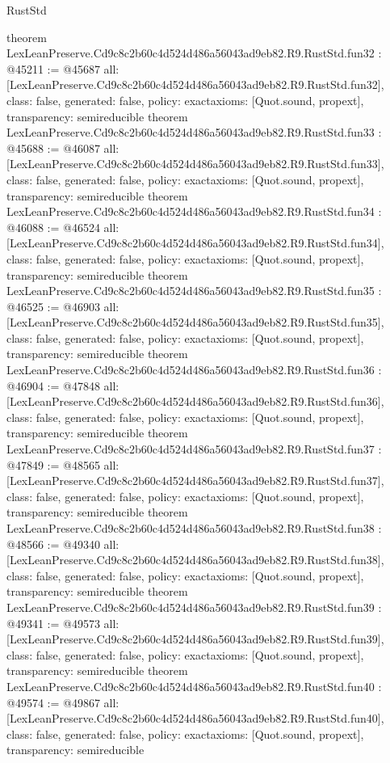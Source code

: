 \begin{lexlean}{RustStd}
\begin{coremodule}
{}
theorem LexLeanPreserve.Cd9c8c2b60c4d524d486a56043ad9eb82.R9.RustStd.fun32 : @45211 := @45687 {
  all: [LexLeanPreserve.Cd9c8c2b60c4d524d486a56043ad9eb82.R9.RustStd.fun32],
  class: false,
  generated: false,
  policy: exact{axioms: [Quot.sound, propext]},
  transparency: semireducible
}
theorem LexLeanPreserve.Cd9c8c2b60c4d524d486a56043ad9eb82.R9.RustStd.fun33 : @45688 := @46087 {
  all: [LexLeanPreserve.Cd9c8c2b60c4d524d486a56043ad9eb82.R9.RustStd.fun33],
  class: false,
  generated: false,
  policy: exact{axioms: [Quot.sound, propext]},
  transparency: semireducible
}
theorem LexLeanPreserve.Cd9c8c2b60c4d524d486a56043ad9eb82.R9.RustStd.fun34 : @46088 := @46524 {
  all: [LexLeanPreserve.Cd9c8c2b60c4d524d486a56043ad9eb82.R9.RustStd.fun34],
  class: false,
  generated: false,
  policy: exact{axioms: [Quot.sound, propext]},
  transparency: semireducible
}
theorem LexLeanPreserve.Cd9c8c2b60c4d524d486a56043ad9eb82.R9.RustStd.fun35 : @46525 := @46903 {
  all: [LexLeanPreserve.Cd9c8c2b60c4d524d486a56043ad9eb82.R9.RustStd.fun35],
  class: false,
  generated: false,
  policy: exact{axioms: [Quot.sound, propext]},
  transparency: semireducible
}
theorem LexLeanPreserve.Cd9c8c2b60c4d524d486a56043ad9eb82.R9.RustStd.fun36 : @46904 := @47848 {
  all: [LexLeanPreserve.Cd9c8c2b60c4d524d486a56043ad9eb82.R9.RustStd.fun36],
  class: false,
  generated: false,
  policy: exact{axioms: [Quot.sound, propext]},
  transparency: semireducible
}
theorem LexLeanPreserve.Cd9c8c2b60c4d524d486a56043ad9eb82.R9.RustStd.fun37 : @47849 := @48565 {
  all: [LexLeanPreserve.Cd9c8c2b60c4d524d486a56043ad9eb82.R9.RustStd.fun37],
  class: false,
  generated: false,
  policy: exact{axioms: [Quot.sound, propext]},
  transparency: semireducible
}
theorem LexLeanPreserve.Cd9c8c2b60c4d524d486a56043ad9eb82.R9.RustStd.fun38 : @48566 := @49340 {
  all: [LexLeanPreserve.Cd9c8c2b60c4d524d486a56043ad9eb82.R9.RustStd.fun38],
  class: false,
  generated: false,
  policy: exact{axioms: [Quot.sound, propext]},
  transparency: semireducible
}
theorem LexLeanPreserve.Cd9c8c2b60c4d524d486a56043ad9eb82.R9.RustStd.fun39 : @49341 := @49573 {
  all: [LexLeanPreserve.Cd9c8c2b60c4d524d486a56043ad9eb82.R9.RustStd.fun39],
  class: false,
  generated: false,
  policy: exact{axioms: [Quot.sound, propext]},
  transparency: semireducible
}
theorem LexLeanPreserve.Cd9c8c2b60c4d524d486a56043ad9eb82.R9.RustStd.fun40 : @49574 := @49867 {
  all: [LexLeanPreserve.Cd9c8c2b60c4d524d486a56043ad9eb82.R9.RustStd.fun40],
  class: false,
  generated: false,
  policy: exact{axioms: [Quot.sound, propext]},
  transparency: semireducible
}
\end{coremodule}
\end{lexlean}
